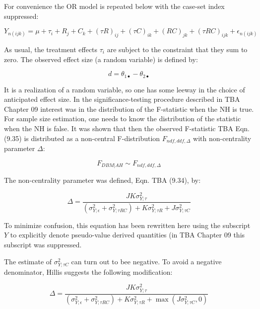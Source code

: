 \documentclass[
]{book}
\begin{document}
For convenience the OR model is repeated below with the case-set index suppressed:

\begin{equation}
Y_{n(ijk)}=\mu+\tau_i+R_j+C_k+(\tau R)_{ij}+(\tau C)_{ik}+(RC)_{jk}+(\tau RC)_{ijk}+\epsilon_ {n(ijk)}
\label{eq:ORModelSsOR}
\end{equation}

As usual, the treatment effects \(\tau_i\) are subject to the constraint that they sum to zero. The observed effect size (a random variable) is defined by:

\begin{equation}
d=\theta_{1\bullet}-\theta_{2\bullet}
\label{eq:EffectSize1}
\end{equation}

It is a realization of a random variable, so one has some leeway in the choice of anticipated effect size. In the significance-testing procedure described in TBA Chapter 09 interest was in the distribution of the F-statistic when the NH is true. For sample size estimation, one needs to know the distribution of the statistic when the NH is false. It was shown that then the observed F-statistic TBA Eqn. (9.35) is distributed as a non-central F-distribution \(F_{ndf,ddf,\Delta}\) with non-centrality parameter \(\Delta\):

\begin{equation}
F_{DBM|AH} \sim F_{ndf,ddf,\Delta}
\label{eq:FDBMSampling1}
\end{equation}

The non-centrality parameter was defined, Eqn. TBA (9.34), by:

\begin{equation}
\Delta=\frac{JK\sigma_{Y;\tau}^2}{\left ( \sigma_{Y;\epsilon}^2 + \sigma_{Y;\tau RC}^2 \right )+K\sigma_{Y;\tau R}^2+J\sigma_{Y;\tau C}^2}
\label{eq:DefDelta1}
\end{equation}

To minimize confusion, this equation has been rewritten here using the subscript \(Y\) to explicitly denote pseudo-value derived quantities (in TBA Chapter 09 this subscript was suppressed.

The estimate of \(\sigma_{Y;\tau C}^2\) can turn out to bee negative. To avoid a negative denominator, Hillis suggests the following modification:

\begin{equation}
\Delta=\frac{JK\sigma_{Y;\tau}^2}{\left ( \sigma_{Y;\epsilon}^2 + \sigma_{Y;\tau RC}^2 \right )+K\sigma_{Y;\tau R}^2+\max \left (J\sigma_{Y;\tau C}^2 ,0 \right )}
\label{eq:DefDeltaHillis1}
\end{equation}
\end{document}
